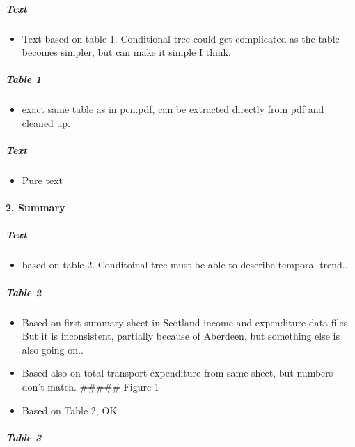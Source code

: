 \documentclass[]{article}
\providecommand{\tightlist}{%
  \setlength{\itemsep}{0pt}\setlength{\parskip}{0pt}}
\let\oldparagraph\paragraph
\renewcommand{\paragraph}[1]{\oldparagraph{#1}\mbox{}}
\let\oldsubparagraph\subparagraph
\renewcommand{\subparagraph}[1]{\oldsubparagraph{#1}\mbox{}}
\begin{document}
\hypertarget{text}{%
\subparagraph{Text}\label{text}}

\begin{itemize}
\tightlist
\item
  Text based on table 1. Conditional tree could get complicated as the
  table becomes simpler, but can make it simple I think.
\end{itemize}

\hypertarget{table-1}{%
\subparagraph{Table 1}\label{table-1}}

\begin{itemize}
\tightlist
\item
  exact same table as in pcn.pdf, can be extracted directly from pdf and
  cleaned up.
\end{itemize}

\hypertarget{text-1}{%
\subparagraph{Text}\label{text-1}}

\begin{itemize}
\tightlist
\item
  Pure text
\end{itemize}

\hypertarget{summary}{%
\paragraph{2. Summary}\label{summary}}

\hypertarget{text-2}{%
\subparagraph{Text}\label{text-2}}

\begin{itemize}
\tightlist
\item
  based on table 2. Conditoinal tree must be able to describe temporal
  trend..
\end{itemize}

\hypertarget{table-2}{%
\subparagraph{Table 2}\label{table-2}}

\begin{itemize}
\item
  Based on first summary sheet in Scotland income and expenditure data
  files. But it is inconsistent, partially because of Aberdeen, but
  something else is also going on..
\item
  Based also on total transport expenditure from same sheet, but numbers
  don't match. \#\#\#\#\# Figure 1
\item
  Based on Table 2, OK
\end{itemize}

\hypertarget{table-3}{%
\subparagraph{Table 3}\label{table-3}}
\end{document}
